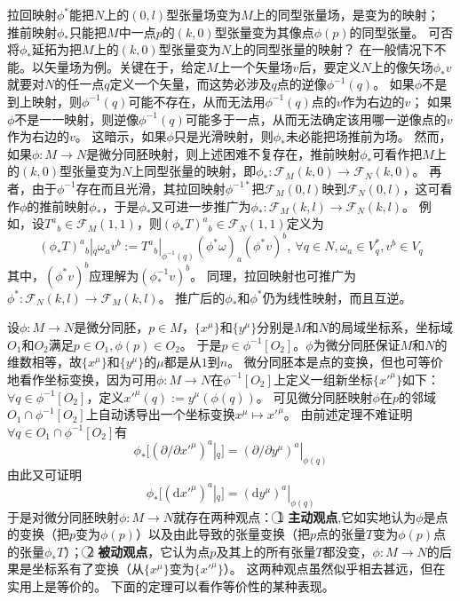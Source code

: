 \begin{note}
	拉回映射$\phi^*$能把$N$上的$(0, l)$型张量场变为$M$上的同型张量场，是变为的映射；
	推前映射$\phi_*$只能把$M$中一点$p$的$(k, 0)$型张量变为其像点$\phi(p)$的同型张量。
	可否将$\phi_*$延拓为把$M$上的$(k, 0)$型张量变为$N$上的同型张量的映射？
	在一般情况下不能。以矢量场为例。关键在于，给定$M$上一个矢量场$v$后，要定义$N$上的像矢场$\phi_*v$就要对$N$的任一点$q$定义一个矢量，而这势必涉及$q$点的逆像$\phi^{-1}(q)$。
	如果$\phi$不是到上映射，则$\phi^{-1}(q)$可能不存在，从而无法用$\phi^{-1}(q)$点的$v$作为右边的$v$；
	如果$\phi$不是一一映射，则逆像$\phi^{-1}(q)$可能多于一点，从而无法确定该用哪一逆像点的$v$作为右边的$v$。
	这暗示，如果$\phi$只是光滑映射，则$\phi_*$未必能把场推前为场。
	然而，如果$\phi \colon M \to N$是微分同胚映射，则上述困难不复存在，推前映射$\phi_*$可看作把$M$上的$(k, 0)$型张量变为$N$上同型张量的映射，即$\phi_* \colon \mathscr{F}_M(k, 0) \to \mathscr{F}_N(k, 0)$。
	再者，由于$\phi^{-1}$存在而且光滑，其拉回映射$\phi^{-1*}$把$\mathscr{F}_M(0, l)$映到$\mathscr{F}_N(0, l)$，这可看作$\phi$的推前映射$\phi_*$，于是$\phi_*$又可进一步推广为$\phi_* \colon \mathscr{F}_M(k, l) \to \mathscr{F}_N(k, l)$。
	例如，设$T^a{}_b \in \mathscr{F}_M(1, 1)$，则$(\phi_*T)^a{}_b \in \mathscr{F}_N(1, 1)$定义为
	$$(\phi_*T)^a{}_b|_q\omega_av^b := T^a{}_b|_{\phi^{-1}(q)}(\phi^*\omega)_a(\phi^*v)^b, ~ \forall q \in N, \omega_a \in V^*_q, v^b \in V_q$$
	其中，$(\phi^*v)^b$应理解为$(\phi^{-1}_*v)^b$。
	同理，拉回映射也可推广为$\phi^* \colon \mathscr{F}_N(k, l) \to \mathscr{F}_M(k, l)$。
	推广后的$\phi_*$和$\phi^*$仍为线性映射，而且互逆。
\end{note}

设$\phi \colon M \to N$是微分同胚，$p \in M$，$\{x^\mu\}$和$\{y^\mu\}$分别是$M$和$N$的局域坐标系，坐标域$O_1$和$O_2$满足$p \in O_1, \phi(p) \in O_2$。
于是$p \in \phi^{-1}[O_2]$。$\phi$为微分同胚保证$M$和$N$的维数相等，故$\{x^\mu\}$和$\{y^\mu\}$的$\mu$都是从$1$到$n$。
微分同胚本是点的变换，但也可等价地看作坐标变换，因为可用$\phi \colon M \to N$在$\phi^{-1}[O_2]$上定义一组新坐标$\{x'^\mu\}$如下：
$\forall q \in \phi^{-1}[O_2]$，定义$x'^\mu(q) := y^\mu(\phi(q))$。
可见微分同胚映射$\phi$在$p$的邻域$O_1 \cap \phi^{-1}[O_2]$上自动诱导出一个坐标变换$x^\mu \mapsto x'^\mu$。
由前述定理不难证明$\forall q \in O_1 \cap \phi^{-1}[O_2]$有
$$\phi_*[(\partial / \partial x'^\mu)^a|_q] = (\partial / \partial y^\mu)^a|_{\phi(q)}$$
由此又可证明
$$\phi_*[(\mathrm{d}x'^\mu)^a|_q] = (\mathrm{d}y^\mu)^a|_{\phi(q)}$$
于是对微分同胚映射$\phi \colon M \to N$就存在两种观点：
\textcircled{1} \textbf{主动观点},它如实地认为$\phi$是点的变换（把$p$变为$\phi(p)$）以及由此导致的张量变换（把$p$点的张量$T$变为$\phi(p)$点的张量$\phi_*T$）；
\textcircled{2} \textbf{被动观点}，它认为点$p$及其上的所有张量$T$都没变，$\phi \colon M \to N$的后果是坐标系有了变换（从$\{x^\mu\}$变为$\{x'^\mu\}$）。
这两种观点虽然似乎相去甚远，但在实用上是等价的。
下面的定理可以看作等价性的某种表现。

